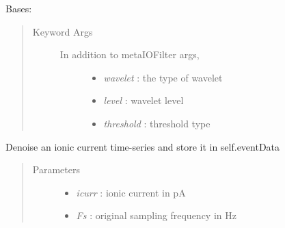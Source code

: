 \documentclass[letterpaper,10pt,english]{sphinxmanual}
\begin{document}
\begin{fulllineitems}
\label{api-doc/mosaic.filter:mosaic.waveletDenoiseFilter.waveletDenoiseFilter}
Bases: {\hyperref[api\string-doc/mosaic.meta:mosaic.metaIOFilter.metaIOFilter]{\emph{}}}
\begin{quote}\begin{description}
\item[{Keyword Args}] \leavevmode\begin{description}
\item[{In addition to metaIOFilter args,}] \leavevmode\begin{itemize}
\item {} 
\emph{wavelet} :           the type of wavelet

\item {} 
\emph{level} :             wavelet level

\item {} 
\emph{threshold} : threshold type

\end{itemize}

\end{description}

\end{description}\end{quote}

\begin{fulllineitems}
\label{api-doc/mosaic.filter:mosaic.waveletDenoiseFilter.waveletDenoiseFilter.filterData}
Denoise an ionic current time-series and store it in self.eventData
\begin{quote}\begin{description}
\item[{Parameters}] \leavevmode\begin{itemize}
\item {} 
\emph{icurr} :     ionic current in pA

\item {} 
\emph{Fs} :        original sampling frequency in Hz

\end{itemize}

\end{description}\end{quote}


\end{fulllineitems}
\end{fulllineitems}
\end{document}
